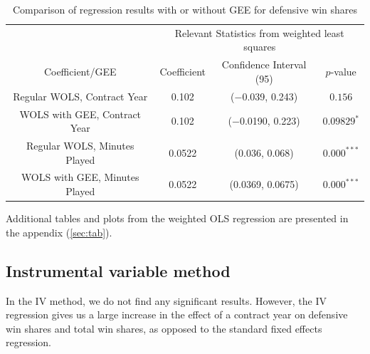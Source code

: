 \documentclass[12pt]{article}
\begin{document}
	\begin{table}[!htbp]
		\centering
		\caption{Comparison of regression results with or without GEE for defensive win shares}
		\label{geelmcomparisond} 
		\begin{tabular}{*4c}
			\toprule
			& \multicolumn{3}{c}{Relevant Statistics from weighted least squares} \\
			\cmidrule(lr){2-4}
			Coefficient/GEE & Coefficient  & Confidence Interval (95) & $p$-value \\
			\midrule
			Regular WOLS, Contract Year & 0.102       & ($-$0.039, 0.243) & $0.156$       \\
			WOLS with GEE, Contract Year & 0.102      & ($-$0.0190, 0.223)       & $0.09829^{*}$ \\
			Regular WOLS, Minutes Played & 0.0522       & (0.036, 0.068) & $0.000^{***}$ \\
			WOLS with GEE, Minutes Played & 0.0522 & (0.0369, 0.0675)       & $0.000^{***}$       \\
			\bottomrule
		\end{tabular}
	\end{table}
	
	Additional tables and plots from the weighted OLS regression are presented in the appendix (\ref{sec:tab}).
	
	\pagebreak
	
	\subsection{Instrumental variable method}
	
	In the IV method, we do not find any significant results. However, the IV regression gives us a large increase in the effect of a contract year on defensive win shares and total win shares, as opposed to the standard fixed effects regression. 
	
\end{document}
